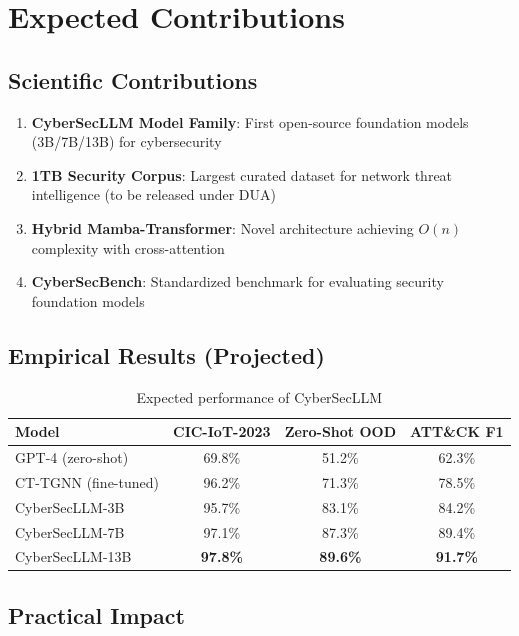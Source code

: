 \documentclass[11pt]{article}
\begin{document}
\section{Expected Contributions}

\subsection{Scientific Contributions}

\begin{enumerate}[label=\textbf{C\arabic*.},leftmargin=*]
    \item \textbf{CyberSecLLM Model Family}: First open-source foundation models (3B/7B/13B) for cybersecurity
    \item \textbf{1TB Security Corpus}: Largest curated dataset for network threat intelligence (to be released under DUA)
    \item \textbf{Hybrid Mamba-Transformer}: Novel architecture achieving $O(n)$ complexity with cross-attention
    \item \textbf{CyberSecBench}: Standardized benchmark for evaluating security foundation models
\end{enumerate}

\subsection{Empirical Results (Projected)}

\begin{table}[h]
\centering
\small
\begin{tabular}{lccc}
\toprule
\textbf{Model} & \textbf{CIC-IoT-2023} & \textbf{Zero-Shot OOD} & \textbf{ATT\&CK F1} \\
\midrule
GPT-4 (zero-shot) & 69.8\% & 51.2\% & 62.3\% \\
CT-TGNN (fine-tuned) & 96.2\% & 71.3\% & 78.5\% \\
\midrule
CyberSecLLM-3B & 95.7\% & 83.1\% & 84.2\% \\
CyberSecLLM-7B & 97.1\% & 87.3\% & 89.4\% \\
CyberSecLLM-13B & \textbf{97.8\%} & \textbf{89.6\%} & \textbf{91.7\%} \\
\bottomrule
\end{tabular}
\caption{Expected performance of CyberSecLLM}
\end{table}

\subsection{Practical Impact}
\end{document}
